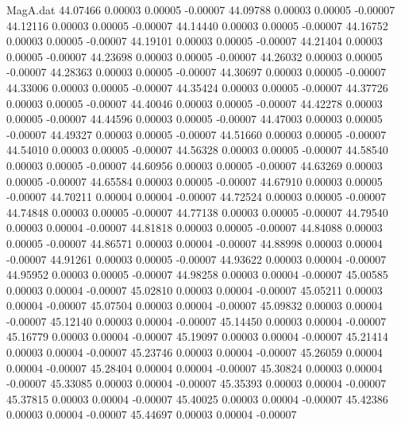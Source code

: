 \begin{filecontents}{MagA.dat}
  44.07466    0.00003    0.00005   -0.00007
  44.09788    0.00003    0.00005   -0.00007
  44.12116    0.00003    0.00005   -0.00007
  44.14440    0.00003    0.00005   -0.00007
  44.16752    0.00003    0.00005   -0.00007
  44.19101    0.00003    0.00005   -0.00007
  44.21404    0.00003    0.00005   -0.00007
  44.23698    0.00003    0.00005   -0.00007
  44.26032    0.00003    0.00005   -0.00007
  44.28363    0.00003    0.00005   -0.00007
  44.30697    0.00003    0.00005   -0.00007
  44.33006    0.00003    0.00005   -0.00007
  44.35424    0.00003    0.00005   -0.00007
  44.37726    0.00003    0.00005   -0.00007
  44.40046    0.00003    0.00005   -0.00007
  44.42278    0.00003    0.00005   -0.00007
  44.44596    0.00003    0.00005   -0.00007
  44.47003    0.00003    0.00005   -0.00007
  44.49327    0.00003    0.00005   -0.00007
  44.51660    0.00003    0.00005   -0.00007
  44.54010    0.00003    0.00005   -0.00007
  44.56328    0.00003    0.00005   -0.00007
  44.58540    0.00003    0.00005   -0.00007
  44.60956    0.00003    0.00005   -0.00007
  44.63269    0.00003    0.00005   -0.00007
  44.65584    0.00003    0.00005   -0.00007
  44.67910    0.00003    0.00005   -0.00007
  44.70211    0.00004    0.00004   -0.00007
  44.72524    0.00003    0.00005   -0.00007
  44.74848    0.00003    0.00005   -0.00007
  44.77138    0.00003    0.00005   -0.00007
  44.79540    0.00003    0.00004   -0.00007
  44.81818    0.00003    0.00005   -0.00007
  44.84088    0.00003    0.00005   -0.00007
  44.86571    0.00003    0.00004   -0.00007
  44.88998    0.00003    0.00004   -0.00007
  44.91261    0.00003    0.00005   -0.00007
  44.93622    0.00003    0.00004   -0.00007
  44.95952    0.00003    0.00005   -0.00007
  44.98258    0.00003    0.00004   -0.00007
  45.00585    0.00003    0.00004   -0.00007
  45.02810    0.00003    0.00004   -0.00007
  45.05211    0.00003    0.00004   -0.00007
  45.07504    0.00003    0.00004   -0.00007
  45.09832    0.00003    0.00004   -0.00007
  45.12140    0.00003    0.00004   -0.00007
  45.14450    0.00003    0.00004   -0.00007
  45.16779    0.00003    0.00004   -0.00007
  45.19097    0.00003    0.00004   -0.00007
  45.21414    0.00003    0.00004   -0.00007
  45.23746    0.00003    0.00004   -0.00007
  45.26059    0.00004    0.00004   -0.00007
  45.28404    0.00004    0.00004   -0.00007
  45.30824    0.00003    0.00004   -0.00007
  45.33085    0.00003    0.00004   -0.00007
  45.35393    0.00003    0.00004   -0.00007
  45.37815    0.00003    0.00004   -0.00007
  45.40025    0.00003    0.00004   -0.00007
  45.42386    0.00003    0.00004   -0.00007
  45.44697    0.00003    0.00004   -0.00007

\end{filecontents}
